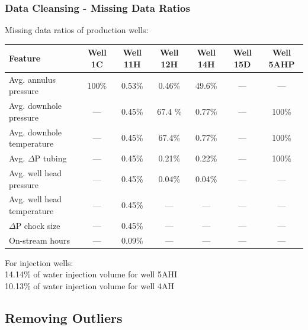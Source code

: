 \documentclass[xcolor=table]{beamer}
\begin{document}
\begin{frame}
\frametitle{Data Cleansing - Missing Data Ratios}
\begin{block}{}
Missing data ratios of production wells:
\end{block}
\begin{table}
\begin{adjustbox}{width=1\linewidth,center}
\begin{tabular}{lcccccc}
\toprule
\textbf{Feature}&\textbf{Well 1C}&\textbf{Well 11H}&\textbf{Well 12H}&\textbf{Well 14H}&\textbf{Well 15D}&\textbf{Well 5AHP}\tabularnewline
\midrule
Avg. annulus pressure&\cellcolor{red!70}100\% & 0.53\% & 0.46\% & \cellcolor{red!70}49.6\% & --- & --- \tabularnewline
Avg. downhole pressure& --- & 0.45\%& \cellcolor{red!70}67.4 \% & 0.77\% & --- &\cellcolor{red!25}100\% \tabularnewline
Avg. downhole temperature& --- & 0.45\%& \cellcolor{red!70}67.4\% & 0.77\% & ---&\cellcolor{red!25}100\%\tabularnewline
Avg. $\Delta$P tubing& ---& 0.45\%&0.21\% & 0.22\% & ---&\cellcolor{red!25}100\% \tabularnewline
Avg. well head pressure& ---& 0.45\% & 0.04\% & 0.04\% & ---& ---\tabularnewline
Avg. well head temperature&---& 0.45\% & --- & --- & ---  & ---\tabularnewline
$\Delta$P chock size &---& 0.45\%& --- & --- & ---& ---\tabularnewline
On-stream hours &---& 0.09\%& --- & --- & ---& ---\tabularnewline
\bottomrule
\end{tabular}
\end{adjustbox}
\end{table}
\begin{block}{}
For injection wells: \\ 14.14\% of water injection volume for well 5AHI \\ 10.13\% of water injection volume for well 4AH
\end{block}
\end{frame}



\subsection{Removing Outliers } 
\end{document}
